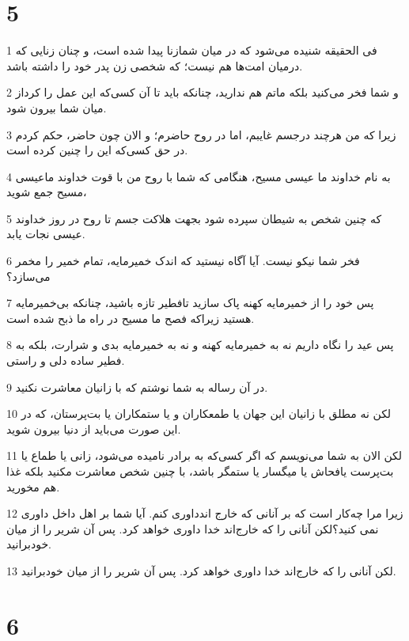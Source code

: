\chapter{5}

\par 1 فی الحقیقه شنیده می‌شود که در میان شمازنا پیدا شده است، و چنان زنایی که درمیان امت‌ها هم نیست؛ که شخصی زن پدر خود را داشته باشد.
\par 2 و شما فخر می‌کنید بلکه ماتم هم ندارید، چنانکه باید تا آن کسی‌که این عمل را کرداز میان شما بیرون شود.
\par 3 زیرا که من هرچند درجسم غایبم، اما در روح حاضرم؛ و الان چون حاضر، حکم کردم در حق کسی‌که این را چنین کرده است.
\par 4 به نام خداوند ما عیسی مسیح، هنگامی که شما با روح من با قوت خداوند ماعیسی مسیح جمع شوید،
\par 5 که چنین شخص به شیطان سپرده شود بجهت هلاکت جسم تا روح در روز خداوند عیسی نجات یابد.
\par 6 فخر شما نیکو نیست. آیا آگاه نیستید که اندک خمیرمایه، تمام خمیر را مخمر می‌سازد؟
\par 7 پس خود را از خمیرمایه کهنه پاک سازید تافطیر تازه باشید، چنانکه بی‌خمیرمایه هستید زیراکه فصح ما مسیح در راه ما ذبح شده است.
\par 8 پس عید را نگاه داریم نه به خمیرمایه کهنه و نه به خمیرمایه بدی و شرارت، بلکه به فطیر ساده دلی و راستی.
\par 9 در آن رساله به شما نوشتم که با زانیان معاشرت نکنید.
\par 10 لکن نه مطلق با زانیان این جهان یا طمعکاران و یا ستمکاران یا بت‌پرستان، که در این صورت می‌باید از دنیا بیرون شوید.
\par 11 لکن الان به شما می‌نویسم که اگر کسی‌که به برادر نامیده می‌شود، زانی یا طماع یا بت‌پرست یافحاش یا میگسار یا ستمگر باشد، با چنین شخص معاشرت مکنید بلکه غذا هم مخورید.
\par 12 زیرا مرا چه‌کار است که بر آنانی که خارج اندداوری کنم. آیا شما بر اهل داخل داوری نمی کنید؟لکن آنانی را که خارج‌اند خدا داوری خواهد کرد. پس آن شریر را از میان خودبرانید.
\par 13 لکن آنانی را که خارج‌اند خدا داوری خواهد کرد. پس آن شریر را از میان خودبرانید.

\chapter{6}

